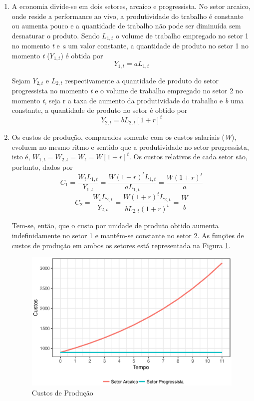 \documentclass[a4paper, 12pt, openright, oneside, german, french, english, brazil]{abntex2}
\begin{document}
	\begin{enumerate}
		\item A economia divide-se em dois setores, arcaico e progressista. No setor arcaico, onde reside a performance ao vivo, a produtividade do trabalho é constante ou aumenta pouco e a quantidade de trabalho não pode ser diminuída sem desnaturar o produto. Sendo $L_{1,t}$ o volume de trabalho empregado no setor 1 no momento \textit{t} e \textit{a} um valor constante, a quantidade de produto no setor 1 no momento \textit{t} ($Y_{1,t}$) é obtida por $$Y_{1,t} = aL_{1,t}$$

		Sejam $Y_{2,t}$ e $L_{2,t}$ respectivamente a quantidade de produto do setor progressista no momento \textit{t} e o volume de trabalho empregado no setor 2 no momento \textit{t}, seja r a taxa de aumento da produtividade do trabalho e \textit{b} uma constante, a quantidade de produto no setor é obtido por $$Y_{2,t} = bL_{2,t}[1+r]^t $$

		\item Os custos de produção, comparados somente com os custos salariais (\textit{W}), evoluem no mesmo ritmo e sentido que a produtividade no setor progressista, isto é, $W_{1,t} = W_{2,t} = W_t = W[1+r]^t$. Os custos relativos de cada setor são, portanto, dados por
		$$C_1 = \frac{W_tL_{1,t}}{Y_{1,t}} = \frac{W(1+r)^tL_{1,t}}{aL_{1,t}} = \frac{W(1+r)^t}{a}$$
		$$C_2 = \frac{W_tL_{2,t}}{Y_{2,t}} = \frac{W(1+r)^tL_{2,t}}{bL_{2,t}(1+r)^t} = \frac{W}{b}$$

		Tem-se, então, que o custo por unidade de produto obtido aumenta indefinidamente no setor 1 e mantém-se constante no setor 2. As funções de custos de produção em ambos os setores está representada na Figura \ref{custos-de-producao}.

		\begin{figure}[!h]
			\centering
			\caption{Custos de Produção}
			\label{custos-de-producao}
			\includegraphics[scale=1]{doenca_dos_custos.eps}
		\end{figure}



\end{enumerate}
\end{document}
